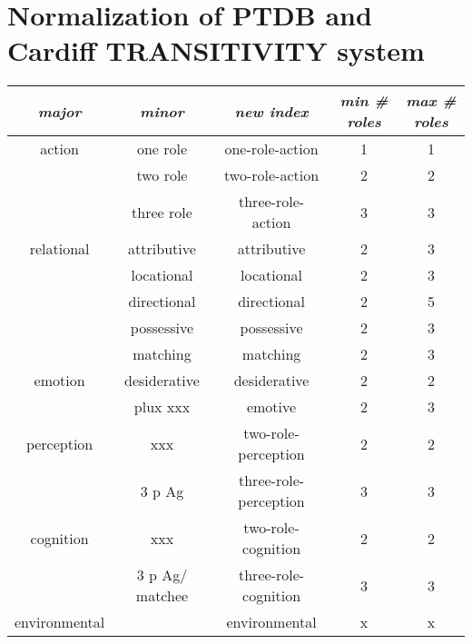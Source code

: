 \chapter{Normalization of PTDB and Cardiff TRANSITIVITY system}
\label{ch:reindexing-ptdb}
\begin{table}[H]
	\centering
	\begin{tabular}{|c|c|c|c|c|}
		\hline
		\textit{major} & \textit{minor}  &  \textit{new index}   & \textit{min \# roles} & \textit{max \# roles} \\ \hline
		action     &    one role     &    one-role-action    &          1           &          1           \\ \hline
		&    two role     &    two-role-action    &          2           &          2           \\ \hline
		&   three role    &   three-role-action   &          3           &          3           \\ \hline
		relational   &   attributive   &      attributive      &          2           &          3           \\ \hline
		&   locational    &      locational       &          2           &          3           \\ \hline
		&   directional   &      directional      &          2           &          5           \\ \hline
		&   possessive    &      possessive       &          2           &          3           \\ \hline
		&    matching     &       matching        &          2           &          3           \\ \hline
		emotion     &  desiderative   &     desiderative      &          2           &          2           \\ \hline
		&    plux xxx     &        emotive        &          2           &          3           \\ \hline
		perception   &       xxx       &  two-role-perception  &          2           &          2           \\ \hline
		&     3 p Ag      & three-role-perception &          3           &          3           \\ \hline
		cognition    &       xxx       &  two-role-cognition   &          2           &          2           \\ \hline
		& 3 p Ag/ matchee & three-role-cognition  &          3           &          3           \\ \hline
		environmental  &                 &     environmental     &          x           &          x           \\ \hline

\end{tabular}
\end{table}

